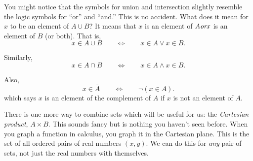 \documentclass[10pt,]{book}
\theoremstyle{plain}
\theoremstyle{definition}
\theoremstyle{definition}
\theoremstyle{definition}
\numberwithin{equation}{section}
\def\Iff{\Leftrightarrow}
\begin{document}
      You might notice that the symbols for union and intersection slightly resemble the logic symbols for ``or'' and ``and.'' This is no accident. What does it mean for \(x\) to be an element of \(A\cup B\)? It means that \(x\) is an element
      of \(A\emph{or}x\) is an element of \(B\) (or both). That is,
      \begin{equation*}
        x \in A \cup B \qquad \Iff \qquad x \in A \vee x \in B.
      \end{equation*}
\par

      Similarly,
      \begin{equation*}
        x \in A \cap B \qquad \Iff \qquad x \in A \wedge x \in B.
      \end{equation*}
\par

      Also,
      \begin{equation*}
        x \in \bar A \qquad \Iff \qquad \neg (x \in A).
      \end{equation*}
      which says \(x\) is an element of the complement of \(A\) if \(x\) is not an element of \(A\).
\par

      There is one more way to combine sets which will be useful for us: the \emph{Cartesian product}, \(A \times B\). This sounds fancy but is nothing you haven't seen before. When you graph a function in calculus, you graph it in the Cartesian
      plane. This is the set of all ordered pairs of real numbers \((x,y)\). We can do this for \emph{any} pair of sets, not just the real numbers with themselves.
\par
\end{document}
